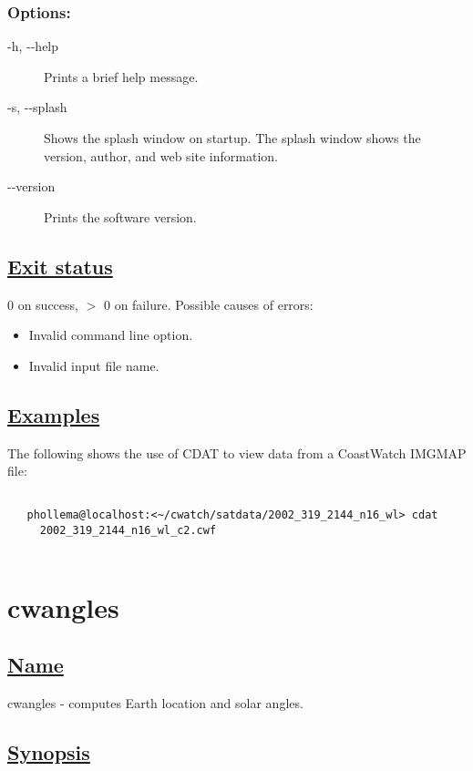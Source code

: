\subsubsection*{Options:}
\begin{description}
\item[-h, -{-}help]Prints a brief help message.
\item[-s, -{-}splash]Shows the splash window on startup. The splash window shows the version, author, and web site information.
\item[-{-}version]Prints the software version.

\end{description}
\subsection*{\underline{Exit status}}


 0 on success, $>$ 0 on failure. Possible causes of errors: \begin{itemize}
\item  Invalid command line option. 
\item  Invalid input file name. 

\end{itemize}

\subsection*{\underline{Examples}}


 The following shows the use of CDAT to view data from a CoastWatch IMGMAP file: \begin{verbatim}

   phollema@localhost:<~/cwatch/satdata/2002_319_2144_n16_wl> cdat 
     2002_319_2144_n16_wl_c2.cwf
 
\end{verbatim}


\newpage
\section{cwangles} \hypertarget{cwangles}{}
\subsection*{\underline{Name}}


   cwangles - computes Earth location and solar angles.  
\subsection*{\underline{Synopsis}}


